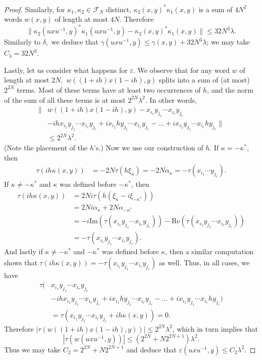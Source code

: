 \documentclass[10pt]{amsart}
\numberwithin{equation}{section}
\theoremstyle{definition}
\newcommand{\cF}{\mathcal{F}}
\newcommand{\ee}{\varepsilon}
\begin{document}
\begin{proof}
    Similarly, for $\kappa_1,\kappa_2 \in \cF_N$ distinct, $\kappa_2(x,y)^*\kappa_1(x,y)$ is a sum of $4N^2$ words $w(x,y)$ of length at most $4N$. Therefore $$\|\kappa_2(uxu^{-1},y)^*\kappa_1(uxu^{-1},y) - \kappa_2(x,y)^*\kappa_1(x,y)\| \le 32N^3\lambda.$$ Similarly to $\delta,$ we deduce that $\gamma(uxu^{-1},y) \le \gamma(x,y) + 32N^3\lambda$; we may take $C_3 = 32N^3$.

    Lastly, let us consider what happens for $\ee.$ We observe that for any word $w$ of length at most $2N,$ $w((1+ih)x(1-ih),y)$ splits into a sum of (at most) $2^{2N}$ terms. Most of these terms have at least two occurrences of $h$, and the norm of the sum of all these terms is at most $2^{2N}\lambda^2$. In other words, 
    \begin{align*}
        \|&w((1+ih)x(1-ih),y) - x_{i_1}y_{j_1}\cdots x_{i_r}y_{j_r}  \\
        &- ihx_{i_1}y_{j_1}\cdots x_{i_r}y_{j_r} + ix_{i_1}hy_{j_1}\cdots x_{i_r}y_{j_r} - \ldots + ix_{i_1}y_{j_1}\cdots x_{i_r}hy_{j_r}\| \\ 
        &\le 2^{2N}\lambda^2.
    \end{align*}
    (Note the placement of the $h$'s.) Now we use our construction of $h$. If $\kappa = -\kappa^*$, then 
    \begin{align*}
        \tau(ih\kappa(x,y)) &= -2N\tau(h\xi_\kappa) = -2N\alpha_\kappa = -\tau(x_{i_1}\cdots y_{j_r}).
    \end{align*}
    If $\kappa \neq -\kappa^*$ and $\kappa$ was defined before $-\kappa^\ast$, then 
    \begin{align*}
        \tau(ih\kappa(x,y)) &= 2Ni\tau(h(\xi_\kappa - i\xi_{-\kappa^*})) \\
        &= 2Ni\alpha_\kappa + 2N\alpha_{-\kappa^*}\\
        &= -i\mathrm{Im}(\tau(x_{i_1}y_{j_1}\cdots x_{i_r}y_{j_r})) - \mathrm{Re}(\tau(x_{i_1}y_{j_1}\cdots x_{i_r}y_{j_r})) \\
        &= -\tau(x_{i_1}y_{j_1}\cdots x_{i_r}y_{j_r}).
    \end{align*}
    And lastly if $\kappa \ne -\kappa^\ast$ and $-\kappa^\ast$ was defined before $\kappa$, then a similar computation shows that $\tau(ih \kappa(x,y)) = - \tau(x_{i_1}y_{j_1}\cdots x_{i_r}y_{j_r})$ as well.
    Thus, in all cases, we have 
    \begin{align*}
        \tau(&x_{i_1}y_{j_1}\cdots x_{i_r}y_{j_r} \\&- ihx_{i_1}y_{j_1}\cdots x_{i_r}y_{j_r} + ix_{i_1}hy_{j_1}\cdots x_{i_r}y_{j_r} - \ldots + ix_{i_1}y_{j_1}\cdots x_{i_r}hy_{j_r})\\ &= \tau(x_{i_1}y_{j_1}\cdots x_{i_r}y_{j_r} + ih\kappa(x,y)) = 0.
    \end{align*}
    Therefore $|\tau(w((1+ih)x(1-ih),y))| \le 2^{2N}\lambda^2$, which in turn implies that $$|\tau(w(uxu^{-1},y))|\le (2^{2N} + N2^{2N+1})\lambda^2.$$ Thus we may take $C_2 = 2^{2N} + N2^{2N+1}$ and deduce that $\ee(uxu^{-1},y) \le C_2\lambda^2$.
\end{proof}
\end{document}
